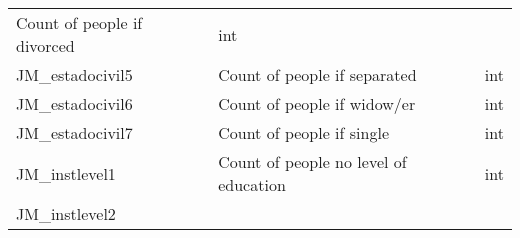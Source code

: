\documentclass[11pt]{article}
\begin{document}
\begin{longtable}[]{@{}lll@{}}
\begin{minipage}[t]{0.12\columnwidth}
Count of people if divorced\strut
\end{minipage} & \begin{minipage}[t]{0.16\columnwidth}\raggedright\strut
int\strut
\end{minipage}\tabularnewline
\begin{minipage}[t]{0.63\columnwidth}\raggedright\strut
JM\_estadocivil5\strut
\end{minipage} & \begin{minipage}[t]{0.12\columnwidth}\raggedright\strut
Count of people if separated\strut
\end{minipage} & \begin{minipage}[t]{0.16\columnwidth}\raggedright\strut
int\strut
\end{minipage}\tabularnewline
\begin{minipage}[t]{0.63\columnwidth}\raggedright\strut
JM\_estadocivil6\strut
\end{minipage} & \begin{minipage}[t]{0.12\columnwidth}\raggedright\strut
Count of people if widow/er\strut
\end{minipage} & \begin{minipage}[t]{0.16\columnwidth}\raggedright\strut
int\strut
\end{minipage}\tabularnewline
\begin{minipage}[t]{0.63\columnwidth}\raggedright\strut
JM\_estadocivil7\strut
\end{minipage} & \begin{minipage}[t]{0.12\columnwidth}\raggedright\strut
Count of people if single\strut
\end{minipage} & \begin{minipage}[t]{0.16\columnwidth}\raggedright\strut
int\strut
\end{minipage}\tabularnewline
\begin{minipage}[t]{0.63\columnwidth}\raggedright\strut
JM\_instlevel1\strut
\end{minipage} & \begin{minipage}[t]{0.12\columnwidth}\raggedright\strut
Count of people no level of education\strut
\end{minipage} & \begin{minipage}[t]{0.16\columnwidth}\raggedright\strut
int\strut
\end{minipage}\tabularnewline
\begin{minipage}[t]{0.63\columnwidth}\raggedright\strut
JM\_instlevel2\strut
\end{minipage} & \begin{minipage}[t]{0.12\columnwidth}\raggedright\strut

\end{minipage}
\end{longtable}
\end{document}
